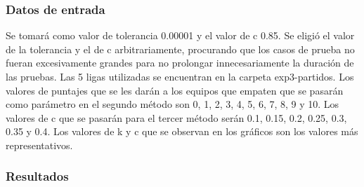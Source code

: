             \subsubsection*{Datos de entrada}
            Se tomará como valor de tolerancia 0.00001 y el valor de c 0.85. Se eligió el valor de la tolerancia y el de c arbitrariamente, procurando que los casos de prueba no fueran excesivamente grandes para no prolongar innecesariamente la duración de las pruebas. Las 5 ligas utilizadas se encuentran en la carpeta exp3-partidos. Los valores de puntajes que se les darán a los equipos que empaten que se pasarán como parámetro en el segundo método son 0, 1, 2, 3, 4, 5, 6, 7, 8, 9 y 10. Los valores de c que se pasarán para el tercer método serán 0.1, 0.15, 0.2, 0.25, 0.3, 0.35 y 0.4. Los valores de k y c que se observan en los gráficos son los valores más representativos.

            \subsubsection*{Resultados}

